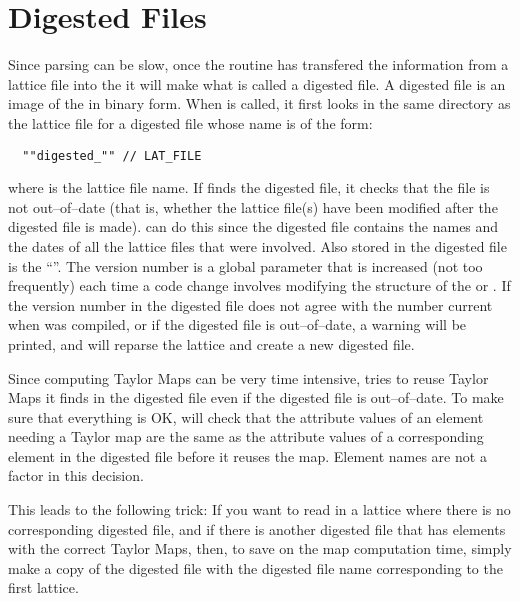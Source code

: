 \section{Digested Files}

Since parsing can be slow, once the  routine has transfered the information from a
lattice file into the  it will make what is called a digested file. A digested file
is an image of the  in binary form. When  is called, it first looks
in the same directory as the lattice file for a digested file whose name is of the form:
\begin{verbatim}
  ""digested_"" // LAT_FILE 
\end{verbatim}
where  is the lattice file name. If  finds the digested file, it checks
that the file is not out--of--date (that is, whether the lattice file(s) have been modified after
the digested file is made).   can do this since the digested file contains the names
and the dates of all the lattice files that were involved. Also stored in the digested file is the
``\bmad {}''. The \bmad version number is a global parameter that is increased (not
too frequently) each time a code change involves modifying the structure of the  or
. If the \bmad version number in the digested file does not agree with the number
current when  was compiled, or if the digested file is out--of--date, a warning will
be printed, and  will reparse the lattice and create a new digested file.

Since computing Taylor Maps can be very time intensive,  tries to reuse Taylor Maps
it finds in the digested file even if the digested file is out--of--date. To make sure that
everything is OK,  will check that the attribute values of an element needing a
Taylor map are the same as the attribute values of a corresponding element in the digested file
before it reuses the map. Element names are not a factor in this decision.

This leads to the following trick: If you want to read in a lattice where there is no corresponding
digested file, and if there is another digested file that has elements with the correct Taylor Maps,
then, to save on the map computation time, simply make a copy of the digested file with the digested
file name corresponding to the first lattice.

